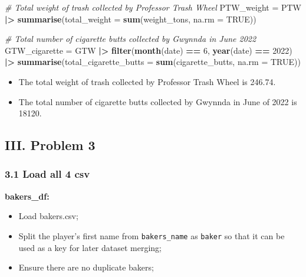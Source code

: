 \documentclass[
]{article}
\newenvironment{Shaded}{\begin{snugshade}}{\end{snugshade}}
\newcommand{\AttributeTok}[1]{\textcolor[rgb]{0.13,0.29,0.53}{#1}}
\newcommand{\CommentTok}[1]{\textcolor[rgb]{0.56,0.35,0.01}{\textit{#1}}}
\newcommand{\ConstantTok}[1]{\textcolor[rgb]{0.56,0.35,0.01}{#1}}
\newcommand{\DecValTok}[1]{\textcolor[rgb]{0.00,0.00,0.81}{#1}}
\newcommand{\FunctionTok}[1]{\textcolor[rgb]{0.13,0.29,0.53}{\textbf{#1}}}
\newcommand{\NormalTok}[1]{#1}
\newcommand{\OtherTok}[1]{\textcolor[rgb]{0.56,0.35,0.01}{#1}}
\newcommand{\SpecialCharTok}[1]{\textcolor[rgb]{0.81,0.36,0.00}{\textbf{#1}}}
\begin{document}
\begin{Shaded}
\begin{Highlighting}[]
\CommentTok{\# Total weight of trash collected by Professor Trash Wheel}
\NormalTok{PTW\_weight }\OtherTok{=}\NormalTok{ PTW }\SpecialCharTok{|\textgreater{}}
  \FunctionTok{summarise}\NormalTok{(}\AttributeTok{total\_weight =} \FunctionTok{sum}\NormalTok{(weight\_tons, }\AttributeTok{na.rm =} \ConstantTok{TRUE}\NormalTok{))}

\CommentTok{\# Total number of cigarette butts collected by Gwynnda in June 2022}
\NormalTok{GTW\_cigarette }\OtherTok{=}\NormalTok{ GTW }\SpecialCharTok{|\textgreater{}}
  \FunctionTok{filter}\NormalTok{(}\FunctionTok{month}\NormalTok{(date) }\SpecialCharTok{==} \DecValTok{6}\NormalTok{, }
         \FunctionTok{year}\NormalTok{(date) }\SpecialCharTok{==} \DecValTok{2022}\NormalTok{) }\SpecialCharTok{|\textgreater{}}
  \FunctionTok{summarise}\NormalTok{(}\AttributeTok{total\_cigarette\_butts =} \FunctionTok{sum}\NormalTok{(cigarette\_butts, }\AttributeTok{na.rm =} \ConstantTok{TRUE}\NormalTok{))}
\end{Highlighting}
\end{Shaded}

\begin{itemize}
\item
  The total weight of trash collected by Professor Trash Wheel is
  246.74.
\item
  The total number of cigarette butts collected by Gwynnda in June of
  2022 is 18120.
\end{itemize}

\subsection{III. Problem 3}\label{iii.-problem-3}

\subsubsection{3.1 Load all 4 csv}\label{load-all-4-csv}

\textbf{bakers\_df:}

\begin{itemize}
\item
  Load bakers.csv;
\item
  Split the player's first name from \texttt{bakers\_name} as
  \texttt{baker} so that it can be used as a key for later dataset
  merging;
\item
  Ensure there are no duplicate bakers;
\end{itemize}
\end{document}

